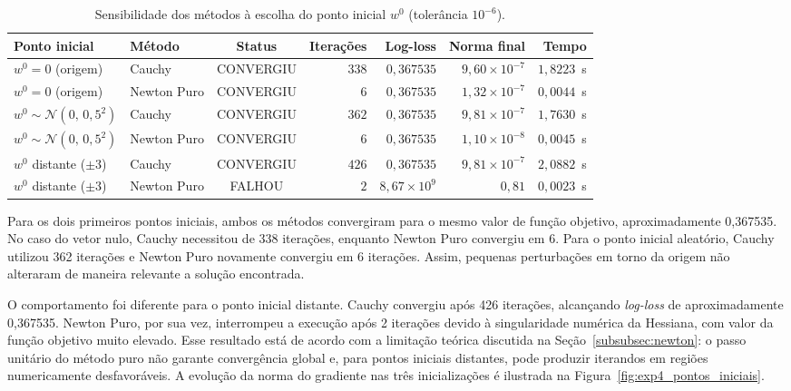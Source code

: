 \documentclass{article}
\theoremstyle{remark}
\begin{document}
\begin{table}[htbp]
\centering
\caption{Sensibilidade dos métodos à escolha do ponto inicial $w^0$ (tolerância $10^{-6}$).}
\label{tab:exp4_pontos_iniciais}
\renewcommand{\arraystretch}{1.15}
{\footnotesize
\setlength{\tabcolsep}{4pt}
\begin{tabularx}{\textwidth}{@{} X l c r r r r @{}}
\toprule
\textbf{Ponto inicial} & \textbf{Método} & \textbf{Status} & \textbf{Iterações} & \textbf{Log-loss} & \textbf{Norma final} & \textbf{Tempo} \\
\midrule
$w^0 = 0$ (origem) & Cauchy & CONVERGIU & $338$ & $0{,}367535$ & $9{,}60 \times 10^{-7}$ & $1{,}8223$~s \\
$w^0 = 0$ (origem) & Newton Puro & CONVERGIU & $6$ & $0{,}367535$ & $1{,}32 \times 10^{-7}$ & $0{,}0044$~s \\
\addlinespace
$w^0 \sim \mathcal{N}(0,\, 0{,}5^2)$ & Cauchy & CONVERGIU & $362$ & $0{,}367535$ & $9{,}81 \times 10^{-7}$ & $1{,}7630$~s \\
$w^0 \sim \mathcal{N}(0,\, 0{,}5^2)$ & Newton Puro & CONVERGIU & $6$ & $0{,}367535$ & $1{,}10 \times 10^{-8}$ & $0{,}0045$~s \\
\addlinespace
$w^0$ distante ($\pm 3$) & Cauchy & CONVERGIU & $426$ & $0{,}367535$ & $9{,}81 \times 10^{-7}$ & $2{,}0882$~s \\
$w^0$ distante ($\pm 3$) & Newton Puro & FALHOU & $2$ & $8{,}67 \times 10^{9}$ & $0{,}81$ & $0{,}0023$~s \\
\bottomrule
\end{tabularx}
}
\end{table}

Para os dois primeiros pontos iniciais, ambos os métodos convergiram para o mesmo valor de função objetivo, aproximadamente 0,367535. No caso do vetor nulo, Cauchy necessitou de 338 iterações, enquanto Newton Puro convergiu em 6. Para o ponto inicial aleatório, Cauchy utilizou 362 iterações e Newton Puro novamente convergiu em 6 iterações. Assim, pequenas perturbações em torno da origem não alteraram de maneira relevante a solução encontrada.

O comportamento foi diferente para o ponto inicial distante. Cauchy convergiu após 426 iterações, alcançando \textit{log-loss} de aproximadamente 0,367535. Newton Puro, por sua vez, interrompeu a execução após 2 iterações devido à singularidade numérica da Hessiana, com valor da função objetivo muito elevado. Esse resultado está de acordo com a limitação teórica discutida na Seção~\ref{subsubsec:newton}: o passo unitário do método puro não garante convergência global e, para pontos iniciais distantes, pode produzir iterandos em regiões numericamente desfavoráveis. A evolução da norma do gradiente nas três inicializações é ilustrada na Figura~\ref{fig:exp4_pontos_iniciais}.
\end{document}
